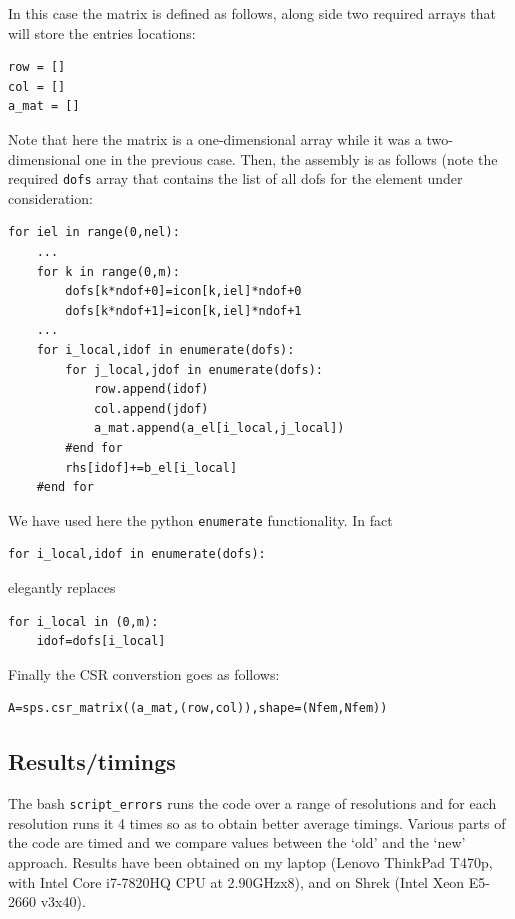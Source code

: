 In this case the matrix is defined as follows, along side two 
required arrays that will store the entries locations:
\begin{lstlisting}
row = [] 
col = []
a_mat = []
\end{lstlisting}
Note that here the matrix is a one-dimensional array
while it was a two-dimensional one in the previous case.
Then, the assembly is as follows (note the required \lstinline{dofs}
array that contains the list of all dofs for the element under consideration:
\begin{lstlisting}
for iel in range(0,nel):
    ...
    for k in range(0,m):
        dofs[k*ndof+0]=icon[k,iel]*ndof+0
        dofs[k*ndof+1]=icon[k,iel]*ndof+1
    ...
    for i_local,idof in enumerate(dofs):
        for j_local,jdof in enumerate(dofs):
            row.append(idof)
            col.append(jdof)
            a_mat.append(a_el[i_local,j_local])
        #end for
        rhs[idof]+=b_el[i_local]
    #end for
\end{lstlisting}
We have used here the python \lstinline{enumerate} functionality. In fact
\begin{lstlisting}
for i_local,idof in enumerate(dofs):
\end{lstlisting}
elegantly replaces
\begin{lstlisting}
for i_local in (0,m):
    idof=dofs[i_local]
\end{lstlisting}
Finally the CSR converstion goes as follows:
\begin{lstlisting}
A=sps.csr_matrix((a_mat,(row,col)),shape=(Nfem,Nfem))
\end{lstlisting}


\subsection*{Results/timings}

The bash {\tt script\_errors} runs the code over a range of resolutions 
and for each resolution runs it 4 times so as to obtain better average 
timings. Various parts of the code are timed and we compare values between 
the `old' and the `new' approach. Results have been obtained on my 
laptop (Lenovo ThinkPad T470p, with Intel Core i7-7820HQ CPU at 2.90GHzx8),
and on Shrek (Intel Xeon E5-2660 v3x40).

